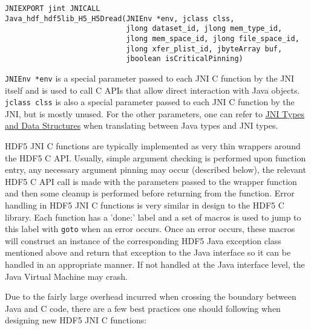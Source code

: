\begin{verbatim}
JNIEXPORT jint JNICALL
Java_hdf_hdf5lib_H5_H5Dread(JNIEnv *env, jclass clss,
                            jlong dataset_id, jlong mem_type_id,
                            jlong mem_space_id, jlong file_space_id,
                            jlong xfer_plist_id, jbyteArray buf,
                            jboolean isCriticalPinning)
\end{verbatim}

\texttt{JNIEnv *env} is a special parameter passed to each JNI C function by the JNI itself and
is used to call C APIs that allow direct interaction with Java objects. \texttt{jclass clss} is
also a special parameter passed to each JNI C function by the JNI, but is mostly unused. For the
other parameters, one can refer to \href{https://docs.oracle.com/en/java/javase/17/docs/specs/jni/types.html}{JNI Types and Data Structures}
when translating between Java types and JNI types.

HDF5 JNI C functions are typically implemented as very thin wrappers around the HDF5 C API. Usually,
simple argument checking is performed upon function entry, any necessary argument pinning may occur
(described below), the relevant HDF5 C API call is made with the parameters passed to the wrapper
function and then some cleanup is performed before returning from the function. Error handling in
HDF5 JNI C functions is very similar in design to the HDF5 C library. Each function has a 'done:'
label and a set of macros is used to jump to this label with \texttt{goto} when an error occurs.
Once an error occurs, these macros will construct an instance of the corresponding HDF5 Java exception
class mentioned above and return that exception to the Java interface so it can be handled in an
appropriate manner. If not handled at the Java interface level, the Java Virtual Machine may crash.

Due to the fairly large overhead incurred when crossing the boundary between Java and C code, there
are a few best practices one should following when designing new HDF5 JNI C functions:


